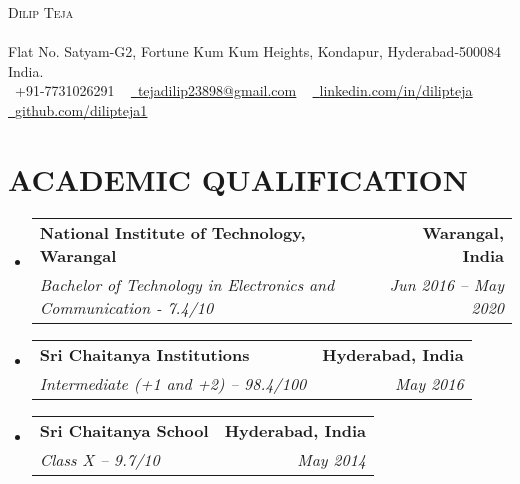 \documentclass[letterpaper,11pt]{article}
\makeatletter
\newcommand{\resumeSubheading}[4]{
  \vspace{-2pt}\item
    \begin{tabular*}{1.0\textwidth}[t]{l@{\extracolsep{\fill}}r}
      \textbf{#1} & \textbf{\small #2} \\
      \textit{\small#3} & \textit{\small #4} \\
    \end{tabular*}\vspace{-7pt}
}
\newcommand{\resumeSubHeadingListStart}{\begin{itemize}[leftmargin=0.0in, label={}]}
\newcommand{\resumeSubHeadingListEnd}{\end{itemize}}
\makeatother
\begin{document}

\begin{center}
    {\Huge \scshape Dilip Teja} \\ \vspace{1pt}
    \vspace{1pt} \\ Flat No. Satyam-G2, Fortune Kum Kum Heights, Kondapur, Hyderabad-500084 India. \\ \vspace{2pt}
    \small \raisebox{-0.1\height}\faPhone\ +91-7731026291 ~ \href{mailto:x@gmail.com}{\raisebox{-0.2\height}\faEnvelope\  \underline{tejadilip23898@gmail.com}} ~ 
    \href{https://linkedin.com/in//}{\raisebox{-0.2\height}\faLinkedin\ \underline{linkedin.com/in/dilipteja}}  ~
    \href{https://github.com/}{\raisebox{-0.2\height}\faGithub\ \underline{github.com/dilipteja1}}
    
\end{center}


\section{ACADEMIC QUALIFICATION}
  \resumeSubHeadingListStart
  
                \resumeSubheading
                    {National Institute of Technology, Warangal}{Warangal, India}
                    {Bachelor of Technology in Electronics and Communication - 7.4/10}
                    {Jun 2016 -- May 2020}

                \resumeSubheading
                   {Sri Chaitanya Institutions}{Hyderabad, India}
                   {Intermediate (+1 and +2) – 98.4/100}{May 2016}      

                \resumeSubheading
                   {Sri Chaitanya School}{Hyderabad, India}
                   {Class X – 9.7/10}{May 2014}       
   
  \resumeSubHeadingListEnd

\end{document}
